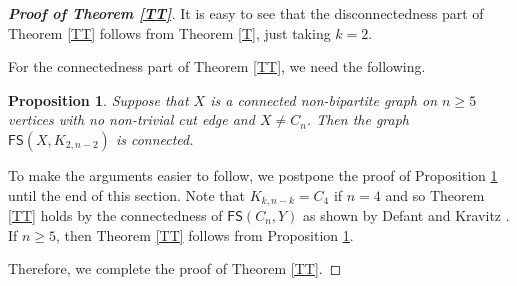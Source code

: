 \documentclass[11pt]{article}
\newtheorem{prop}[thm]{Proposition}%
\newcommand{\FS}{\mathsf{FS}}
\begin{document}
\begin{proof}[\bfseries{Proof of Theorem \ref{TT}}] It is easy to see that  
the disconnectedness part  of Theorem \ref{TT} follows from Theorem \ref{T}, just taking $k=2$.

 For the connectedness part of Theorem \ref{TT}, we need the following.
 \begin{prop}\label{P2}
Suppose that $X$ is a connected non-bipartite graph on $n\ge 5$ vertices with no non-trivial cut edge and $X\not=C_n$. Then the graph $\FS(X, K_{2,n-2})$ is connected. 
\end{prop}
To make the arguments easier to follow, we postpone the proof of Proposition \ref{P2} until the end of this section.
 Note that  $K_{k,n-k}=C_4$ if $n=4$ and so Theorem \ref{TT} holds by the connectedness of $\FS(C_n,Y)$  as shown by Defant and Kravitz \cite{DK}. If  $n\ge 5$, then Theorem \ref{TT} follows from Proposition \ref{P2}. 
 
 Therefore, we complete the proof of Theorem \ref{TT}.
 \end{proof}
\end{document}
